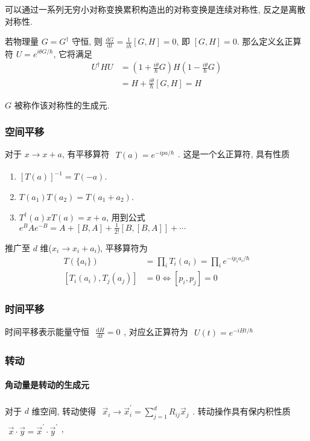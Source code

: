 \documentclass[../../main.tex]{subfiles}
\begin{document}
可以通过一系列无穷小对称变换累积构造出的对称变换是连续对称性, 反之是离散对称性.

若物理量 $G=G^{\dagger}$ 守恒, 则 $\frac{\mathrm{d}G}{\mathrm{d}t} = \frac{1}{i\hbar}[G,H] = 0$, 即 $[G,H]=0$. 那么定义幺正算符 $U = e^{i\theta G/\hbar}$, 它将满足 
\begin{align*}
    U^{\dagger}HU &= \left(1 + \frac{i\theta}{\hbar}G\right)H\left(1 - \frac{i\theta}{\hbar}G\right)\\
    &= H + \frac{i\theta}{\hbar}[G,H] = H
\end{align*}

$G$ 被称作该对称性的生成元. 
\subsubsection{空间平移}
对于 $x\rightarrow x + a$, 有平移算符 $\begin{aligned}
    T(a) = e^{-ipa/\hbar}
\end{aligned}$. 这是一个幺正算符, 具有性质
\begin{enumerate}
    \item $[T(a)]^{-1} = T(-a)$.
    \item $T(a_{1})T(a_{2}) = T(a_{1}+a_{2})$.
    \item $T^{\dagger}(a)xT(a) = x + a$, 用到公式 $e^{B}Ae^{-B} = A + [B,A] + \frac{1}{2!}[B,[B,A]] + \cdots$
\end{enumerate}
推广至 $d$ 维($x_{i}\rightarrow x_{i} + a_{i}$), 平移算符为
\begin{align*}
    T(\{ a_{i}\}) &= \prod_{i}T_{i}(a_{i}) = \prod_{i}e^{-ip_{i}a_{i}/\hbar}\\
    [T_{i}(a_{i}), T_{j}(a_{j})] &= 0\iff [p_{i}, p_{j}] = 0
\end{align*}

\subsubsection{时间平移}
时间平移表示能量守恒 $\begin{aligned}
    \frac{\mathrm{d}H}{\mathrm{d}t} = 0
\end{aligned}$, 对应幺正算符为 $\begin{aligned}
    U(t) = e^{-iHt/\hbar}
\end{aligned}$
\subsubsection{转动}
\paragraph{角动量是转动的生成元}
对于 $d$ 维空间, 转动使得 $\begin{aligned}
    \vec{x}_{i}\rightarrow \vec{x}_{i}^{\prime} = \sum_{j =1}^{d}R_{ij}\vec{x}_{j}
\end{aligned}$. 转动操作具有保内积性质 $\begin{aligned}
    \vec{x}\cdot \vec{y} = \vec{x}^{\prime}\cdot \vec{y}^{\prime}
\end{aligned}$, 
\end{document}
